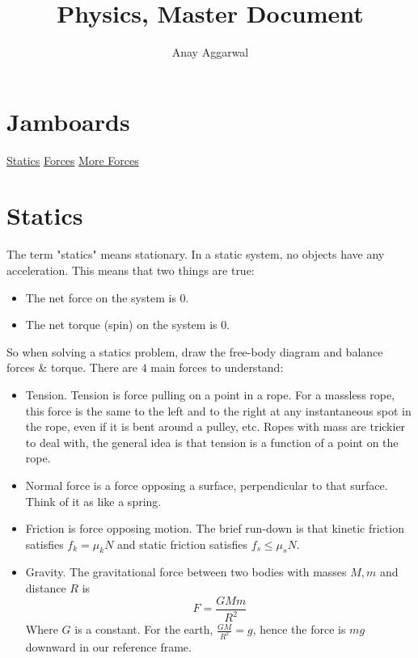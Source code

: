 \documentclass[11pt]{scrartcl}
\title{Physics, Master Document}
\author{Anay Aggarwal}
\begin{document}
\maketitle
\section{Jamboards}
\href{https://jamboard.google.com/d/1uoYdMKXinEdf1\_fIV\_Um4zPiH8XeXSZzDs1etD-xgbI/viewer?f=0}{Statics} \newline
\href{https://jamboard.google.com/d/1ajkcgySLsFFmAIlD7kHRhOTfPmT233VM9uvkb6ygHFg/viewer?f=0}{Forces} \newline
\href{https://jamboard.google.com/d/19tQ1\_l9Pz5J62Dyj3KkGLjumSymWhyoXW8kS4kQQBSg/viewer?f=0}{More Forces}
\newpage
\section{Statics}
The term "statics" means stationary. In a static system, no objects have any acceleration.
This means that two things are true:
\begin{itemize}
  \item The net force on the system is $0$.
  \item The net torque (spin) on the system is $0$.
\end{itemize}
So when solving a statics problem, draw the free-body diagram and balance forces \& torque.
There are $4$ main forces to understand:
\begin{itemize}
  \item Tension. Tension is force pulling on a point in a rope. For a massless rope, this force is the same to the left and to the right
    at any instantaneous spot in the rope, even if it is bent around a pulley, etc. Ropes with mass are trickier to deal with, the general
    idea is that tension is a function of a point on the rope.
  \item Normal force is a force opposing a surface, perpendicular to that surface. Think of it as like a spring.
  \item Friction is force opposing motion. The brief run-down is that kinetic friction satisfies $f_k=\mu_k N$ and static friction satisfies
    $f_s\le \mu_s N$.
  \item Gravity. The gravitational force between two bodies with masses $M,m$ and distance $R$ is
    $$F=\frac{GMm}{R^2}$$
    Where $G$ is a constant. For the earth, $\frac{GM}{R^2}=g$, hence the force is $mg$ downward in our reference frame.
\end{itemize}
\end{document}
